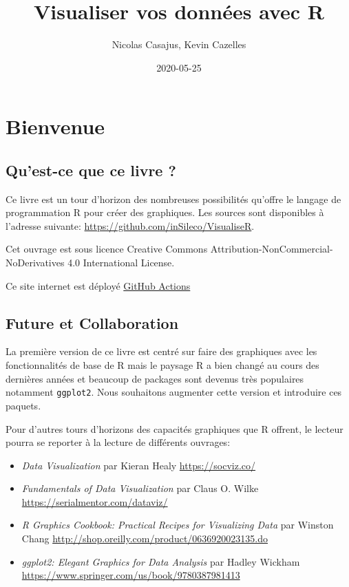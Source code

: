 \documentclass[]{article}
\title{Visualiser vos données avec R}
\author{Nicolas Casajus, Kevin Cazelles}
\date{2020-05-25}
\providecommand{\tightlist}{%
  \setlength{\itemsep}{0pt}\setlength{\parskip}{0pt}}
\begin{document}
\maketitle

{
\setcounter{tocdepth}{2}
\tableofcontents
}
\hypertarget{bienvenue}{%
\section*{Bienvenue}\label{bienvenue}}

\hypertarget{quest-ce-que-ce-livre}{%
\subsection*{Qu'est-ce que ce livre ?}\label{quest-ce-que-ce-livre}}

Ce livre est un tour d'horizon des nombreuses possibilités qu'offre le
langage de programmation R pour créer des graphiques. Les sources sont
disponibles à l'adresse suivante: \url{https://github.com/inSileco/VisualiseR}.

Cet ouvrage est sous licence
Creative Commons Attribution-NonCommercial-NoDerivatives 4.0 International License.

Ce site internet est déployé \href{https://github.com/features/actions}{GitHub
Actions}

\hypertarget{future-et-collaboration}{%
\subsection*{Future et Collaboration}\label{future-et-collaboration}}

La première version de ce livre est centré sur faire des graphiques avec les
fonctionnalités de base de R mais le paysage R a bien changé au cours des
dernières années et beaucoup de packages sont devenus très populaires notamment
\texttt{ggplot2}. Nous souhaitons augmenter cette version et introduire ces paquets.

Pour d'autres tours d'horizons des capacités graphiques que R offrent,
le lecteur pourra se reporter à la lecture de différents ouvrages:

\begin{itemize}
\tightlist
\item
  \emph{Data Visualization} par Kieran Healy \url{https://socviz.co/}
\item
  \emph{Fundamentals of Data Visualization} par Claus O. Wilke \url{https://serialmentor.com/dataviz/}
\item
  \emph{R Graphics Cookbook: Practical Recipes for Visualizing Data} par Winston Chang \url{http://shop.oreilly.com/product/0636920023135.do}
\item
  \emph{ggplot2: Elegant Graphics for Data Analysis} par Hadley Wickham
  \url{https://www.springer.com/us/book/9780387981413}
\end{itemize}
\end{document}
